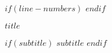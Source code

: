 \doublespacing

$if(line-numbers)$
\linenumbers
$endif$

\begin{flushleft}

\Large{
  \textbf{$title$}
}

$if(subtitle)$
\large{
  \textbf{$subtitle$}
}
$endif$

\end{flushleft}

